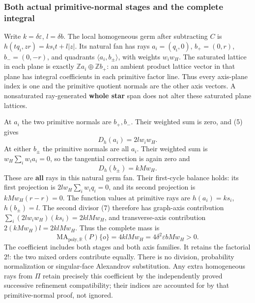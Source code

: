 \documentclass[
  11pt,
]{article}
\begin{document}
\subsubsection{Both actual primitive-normal stages and the complete
integral}\label{both-actual-primitive-normal-stages-and-the-complete-integral}

Write \(k=\delta\varepsilon\), \(l=\delta b\). The local homogeneous
germ after subtracting \(C\) is \(h(tq_i,zr)=ks_it+l|z|\). Its natural
fan has rays \(a_i=(q_i,0)\), \(b_+=(0,r)\), \(b_-=(0,-r)\), and
quadrants \(\langle a_i,b_\pm\rangle\), with weights \(w_iw_H\). The
saturated lattice in each plane is exactly
\(\mathbb Za_i\oplus\mathbb Zb_+\): an ambient product lattice vector in
that plane has integral coefficients in each primitive factor line. Thus
every axis-plane index is one and the primitive quotient normals are the
other axis vectors. A nonsaturated ray-generated \textbf{whole star}
span does not alter these saturated plane lattices.

At \(a_i\) the two primitive normals are \(b_+,b_-\). Their weighted sum
is zero, and (5) gives \[
                       D_h(a_i)=2l w_iw_H.                 \tag{HR17}
\] At either \(b_\pm\) the primitive normals are all \(a_i\). Their
weighted sum is \(w_H\sum_iw_i a_i=0\), so the tangential correction is
again zero and \[
                       D_h(b_\pm)=kMw_H.                  \tag{HR18}
\] These are \textbf{all} rays in this natural germ fan. Their
first-cycle balance holds: its first projection is
\(2lw_H\sum_iw_iq_i=0\), and its second projection is \(kMw_H(r-r)=0\).
The function values at primitive rays are \(h(a_i)=ks_i\),
\(h(b_\pm)=l\). The second divisor (7) therefore has graph-axis
contribution \(\sum_i(2lw_iw_H)(ks_i)=2klMw_H\), and transverse-axis
contribution \(2(kMw_H)l=2klMw_H\). Thus the complete mass is \[
 \mathrm{MA}_{\mathrm{poly},\mathbb R}(P)\{o\}
       =4klMw_H=4\delta^2\varepsilon bMw_H>0.                \tag{HR19}
\] The coefficient includes both stages and both axis families. It
retains the factorial \(2!\): the two mixed orders contribute equally.
There is no division, probability normalization or singular-face
Alexandrov substitution. Any extra homogeneous rays from \(\Pi\) retain
precisely this coefficient by the independently proved successive
refinement compatibility; their indices are accounted for by that
primitive-normal proof, not ignored.
\end{document}
